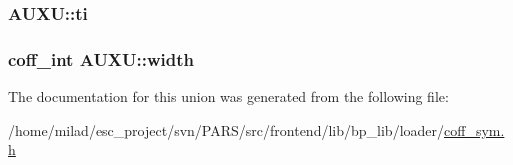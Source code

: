 \label{unionAUXU_a94430b9767d7cdd6319772ede408e526}
\hypertarget{unionAUXU_aeed8d219ef07fd07c30c04690e566191}{
\subsubsection[{ti}]{ {\bf AUXU::ti}}}
\label{unionAUXU_aeed8d219ef07fd07c30c04690e566191}
\hypertarget{unionAUXU_a9c1651961315a871bd30484de8df7818}{
\subsubsection[{width}]{\setlength{\rightskip}{0pt plus 5cm}coff\_\-int {\bf AUXU::width}}}
\label{unionAUXU_a9c1651961315a871bd30484de8df7818}


The documentation for this union was generated from the following file:\begin{DoxyCompactItemize}
\item 
/home/milad/esc\_\-project/svn/PARS/src/frontend/lib/bp\_\-lib/loader/\hyperlink{coff__sym_8h}{coff\_\-sym.h}\end{DoxyCompactItemize}
